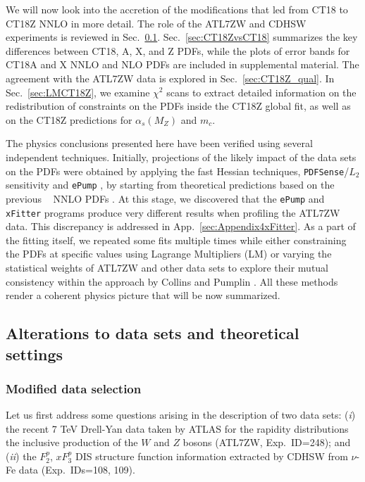 We will now look into the accretion of the modifications that led from CT18 to CT18Z NNLO in more detail. The role of the ATL7ZW and CDHSW experiments is reviewed in Sec.~\ref{sec:CT18Z_changes}. Sec.~\ref{sec:CT18ZvsCT18} summarizes the key differences between CT18, A, X, and Z PDFs, while the plots of error bands for CT18A and X NNLO and NLO PDFs are included in supplemental material. 
The agreement with the ATL7ZW data is explored in Sec.~\ref{sec:CT18Z_qual}. 
In Sec.~\ref{sec:LMCT18Z}, we examine $\chi^2$ scans to extract detailed information on the redistribution of constraints on the PDFs inside the CT18Z global fit, as well as on the CT18Z predictions for $\alpha_s(M_Z)$ and $m_c$.

The physics conclusions presented here have been verified using
several independent techniques. Initially, projections of the likely
impact of the data sets on the PDFs were obtained by applying the fast
Hessian techniques, \texttt{PDFSense}/$L_2$
sensitivity \cite{Wang:2018heo,Hobbs:2019gob}
and \texttt{ePump} \cite{Hou:2019gfw}, by starting from theoretical
predictions based on the previous \CTHERAII~ NNLO
PDFs \cite{Hou:2016nqm}. At this stage, we discovered that
the \texttt{ePump} and \texttt{xFitter} programs produce very
different results when profiling the ATL7ZW data. This discrepancy
is addressed in App.~\ref{sec:Appendix4xFitter}.
As a part of the fitting itself, we repeated
some fits multiple times while either constraining the PDFs at
specific values using Lagrange Multipliers (LM) or varying the
statistical weights of ATL7ZW and other data sets to explore their
mutual consistency within the approach by Collins and
Pumplin \cite{Collins:2001es}. All these methods render a coherent
physics picture that will be now summarized. 

%
\subsection{Alterations to data sets and theoretical settings}
\label{sec:CT18Z_changes}

\subsubsection{Modified data selection}
%
Let us first address some questions arising in the description
of two data sets: ({\it i}) the recent 7 TeV Drell-Yan data taken by ATLAS for the rapidity distributions the inclusive production
of the $W$ and $Z$ bosons (ATL7ZW, Exp.~ID=248); and ({\it ii}) the $F^p_2$, $xF^p_3$ DIS structure function information
extracted by CDHSW from $\nu$-Fe data (Exp.~IDs=108, 109).

